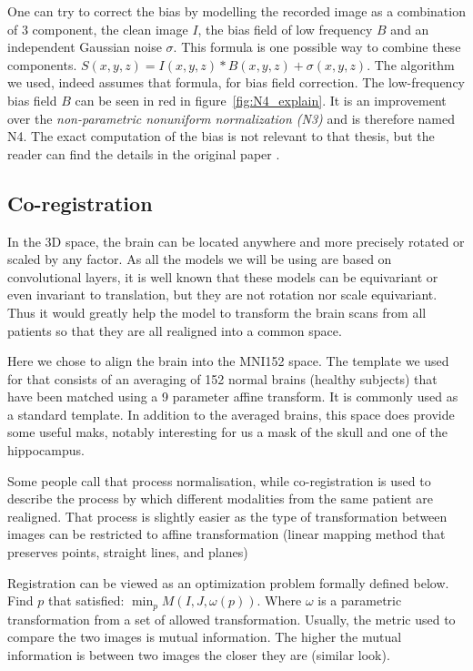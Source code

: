 One can try to correct the bias by modelling the recorded image as a combination of 3 component, the clean image $I$, the bias field of low frequency $B$ and an independent Gaussian noise $\sigma$. This formula is one possible way to combine these components. $S(x,y,z)= I(x,y,z)*B(x,y,z) +\sigma(x,y,z)$. The algorithm we used, indeed assumes that formula, for bias field correction. The low-frequency bias field $B$ can be seen in red in figure~\ref{fig:N4_explain}. It is an improvement over the \textit{non-parametric nonuniform normalization (N3)} and is therefore named N4. 
The exact computation of the bias is not relevant to that thesis, but the reader can find the details in the original paper \cite{N4_paper}.


\subsection{Co-registration}
\label{sec:coregistration}

In the 3D space, the brain can be located anywhere and more precisely rotated or scaled by any factor. As all the models we will be using are based on convolutional layers, it is well known that these models can be equivariant or even invariant to translation, but they are not rotation nor scale equivariant. Thus it would greatly help the model to transform the brain scans from all patients so that they are all realigned into a common space. 

Here we chose to align the brain into the MNI152 space\footnotemark{}. The template we used for that consists of an averaging of 152 normal brains (healthy subjects) that have been matched using a 9 parameter affine transform. It is commonly used as a standard template. In addition to the averaged brains, this space does provide some useful maks, notably interesting for us a mask of the skull and one of the hippocampus.

Some people call that process normalisation, while co-registration is used to describe the process by which different modalities from the same patient are realigned. That process is slightly easier as the type of transformation between images can be restricted to affine transformation (linear mapping method that preserves points, straight lines, and planes)

Registration can be viewed as an optimization problem formally defined below.
Find $p$ that satisfied:  $\displaystyle  \min_{p} M(I,J, \omega(p))$. Where $\omega$ is a parametric transformation from a set of allowed transformation. Usually, the metric used to compare the two images is mutual information. The higher the mutual information is between two images the closer they are (similar look).

